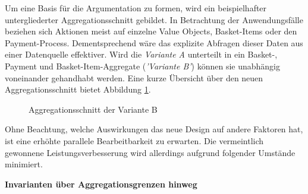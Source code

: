 Um eine Basis für die Argumentation zu formen, wird ein beispielhafter untergliederter Aggregationsschnitt gebildet. In Betrachtung der Anwendungsfälle beziehen sich Aktionen meist auf einzelne Value Objects, Basket-Items oder den Payment-Process. Dementsprechend wäre das explizite Abfragen dieser Daten aus einer Datenquelle effektiver. Wird die \emph{Variante A} unterteilt in ein Basket-, Payment und Basket-Item-Aggregate (\emph{'Variante B'}) können sie unabhängig voneinander gehandhabt werden. Eine kurze Übersicht über den neuen Aggregationsschnitt bietet Abbildung \ref{fig:VarB}. 

\begin{figure}[H]
	\vspace{0.3cm}
	\centering
	
	\caption{Aggregationsschnitt der Variante B}
	\label{fig:VarB}
\end{figure}

Ohne Beachtung, welche Auswirkungen das neue Design auf andere Faktoren hat, ist eine erhöhte parallele Bearbeitbarkeit zu erwarten. Die vermeintlich gewonnene Leistungsverbesserung wird allerdings aufgrund folgender Umstände minimiert.

\vspace{1em}

\textbf{Invarianten über Aggregationsgrenzen hinweg}

